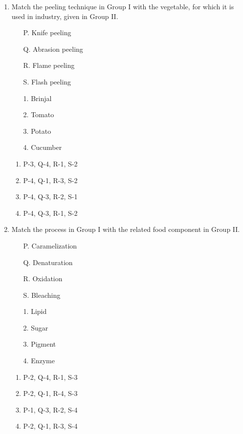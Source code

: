\documentclass[journal,12pt,onecolumn]{IEEEtran}
\begin{document}
\begin{enumerate}
    \item \begin{minipage}{0.45\textwidth}
    Match the peeling technique in Group I with the vegetable, for which it is used in industry, given in Group II.
    \begin{itemize}
        \item[P.] Knife peeling
        \item[Q.] Abrasion peeling
        \item[R.] Flame peeling
        \item[S.] Flash peeling
    \end{itemize}
    \end{minipage}
    \begin{minipage}{0.45\textwidth}
    \begin{itemize}
        \item[1.] Brinjal
        \item[2.] Tomato
        \item[3.] Potato
        \item[4.] Cucumber
    \end{itemize}
    \end{minipage}
    \begin{enumerate}
        \item P-3, Q-4, R-1, S-2
        \item P-4, Q-1, R-3, S-2
        \item P-4, Q-3, R-2, S-1
        \item P-4, Q-3, R-1, S-2
    \end{enumerate}

    \item \begin{minipage}{0.45\textwidth}
    Match the process in Group I with the related food component in Group II.
    \begin{itemize}
        \item[P.] Caramelization
        \item[Q.] Denaturation
        \item[R.] Oxidation
        \item[S.] Bleaching
    \end{itemize}
    \end{minipage}
    \begin{minipage}{0.45\textwidth}
    \begin{itemize}
        \item[1.] Lipid
        \item[2.] Sugar
        \item[3.] Pigment
        \item[4.] Enzyme
    \end{itemize}
    \end{minipage}
    \begin{enumerate}
        \item P-2, Q-4, R-1, S-3
        \item P-2, Q-1, R-4, S-3
        \item P-1, Q-3, R-2, S-4
        \item P-2, Q-1, R-3, S-4
    \end{enumerate}


\end{enumerate}
\end{document}
